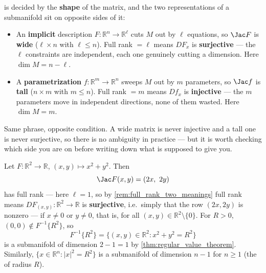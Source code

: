 \begin{importantremark}
\label{rem:full_rank_two_meanings}
 is decided by the \textbf{shape} of the matrix, and the two representations of a
submanifold sit on opposite sides of it:
\begin{itemize}
  \item An \textbf{implicit} description $F : \mathbb{R}^n \to \mathbb{R}^\ell$ cuts $M$ out by
    $\ell$ equations, so $\Jac F$ is \textbf{wide} ($\ell \times n$ with $\ell \leq n$). Full
    rank $=\ell$ means $DF_x$ is \textbf{surjective} --- the $\ell$ constraints are independent,
    each one genuinely cutting a dimension. Here $\dim M = n - \ell$.
  \item A \textbf{parametrization} $f : \mathbb{R}^m \to \mathbb{R}^n$ sweeps $M$ out by $m$
    parameters, so $\Jac f$ is \textbf{tall} ($n \times m$ with $m \leq n$). Full rank $=m$
    means $Df_x$ is \textbf{injective} --- the $m$ parameters move in independent directions,
    none of them wasted. Here $\dim M = m$.
\end{itemize}
Same phrase, opposite condition. A wide matrix is never injective and a tall one is never
surjective, so there is no ambiguity in practice --- but it is worth checking which side you are
on before writing down what  is supposed to give you.
\end{importantremark}

\begin{example}
Let $F : \mathbb{R}^2 \to \mathbb{R}$, $(x,y) \mapsto x^2+y^2$. Then
\[\Jac F(x,y) = (2x,\ 2y)\]
has full rank --- here $\ell = 1$, so by \cref{rem:full_rank_two_meanings} full rank means
$DF_{(x,y)} : \mathbb{R}^2 \to \mathbb{R}$ is \textbf{surjective}, i.e.\ simply that the row
$(2x,2y)$ is nonzero --- if $x \neq 0$ or $y \neq 0$, that is,
for all $(x,y) \in \mathbb{R}^2\setminus\{0\}$. For $R>0$, $(0,0) \notin F^{-1}\{R^2\}$, so
\[F^{-1}\{R^2\} = \{(x,y) \in \mathbb{R}^2 : x^2+y^2=R^2\}\]
is a submanifold of dimension $2-1=1$ by \cref{thm:regular_value_theorem}. Similarly,
$\{x \in \mathbb{R}^n : |x|^2=R^2\}$ is a submanifold of dimension $n-1$ for $n \geq 1$ (the
 of radius $R$).
\end{example}

\begin{center}
\end{center}


